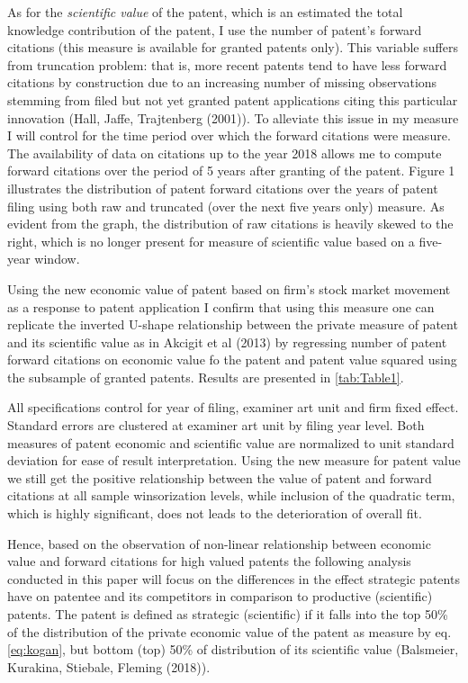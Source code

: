 \documentclass[11pt]{article}
\begin{document}
As for the\textit{ scientific value} of the patent, which is an estimated the total knowledge contribution
of the patent, I use the number of patent's forward citations (this measure is available for granted
patents only). This variable suffers from truncation problem: that is, more recent patents tend to
have less forward citations by construction due to an increasing number of missing observations
stemming from filed but not yet granted patent applications citing this particular innovation  \color{blue}(Hall,
Jaffe, Trajtenberg (2001))\color{black}. To alleviate this issue in my measure I will control for the time period
over which the forward citations were measure. The availability of data on citations up to the year
2018 allows me to compute forward citations over the period of 5 years after granting of the patent.
Figure 1 illustrates the distribution of patent forward citations over the years of patent filing using
both raw and truncated (over the next five years only) measure. As evident from the graph, the
distribution of raw citations is heavily skewed to the right, which is no longer present for measure
of scientific value based on a five-year window.


Using the new economic value of patent based on firm's stock market movement as a response to patent application I confirm that using this measure one can replicate the inverted U-shape relationship between the private measure of patent and its scientific value as in \color{blue}Akcigit et al (2013) \color{black} by regressing number of patent forward citations on economic value fo the patent and patent value squared using the subsample of granted patents. Results are presented in \autoref{tab:Table1}.

All specifications control for year of filing, examiner art unit and firm fixed effect. Standard
errors are clustered at examiner art unit by filing year level. Both measures of patent economic and
scientific value are normalized to unit standard deviation for ease of result interpretation. Using the
new measure for patent value we still get the positive relationship between the value of patent and
forward citations at all sample winsorization levels, while inclusion of the quadratic term, which is
highly significant, does not leads to the deterioration of overall fit.

Hence, based on the observation of non-linear relationship between economic value and forward
citations for high valued patents the following analysis conducted in this paper will focus on the
differences in the effect strategic patents have on patentee and its competitors in comparison to
productive (scientific) patents. The patent is defined as strategic (scientific) if it falls into the top
50\% of the distribution of the private economic value of the patent as measure by eq.\eqref{eq:kogan}, but
bottom (top) 50\% of distribution of its scientific value \color{blue}(Balsmeier, Kurakina, Stiebale, Fleming
(2018))\color{black}.
\end{document}
